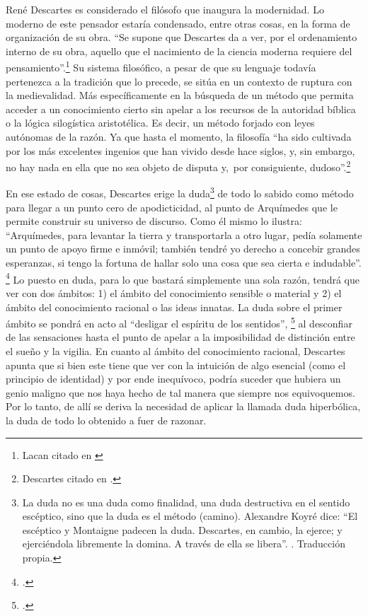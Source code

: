 René Descartes es considerado el filósofo que inaugura la modernidad. Lo moderno de este pensador estaría condensado, entre otras cosas, en la forma de organización de su obra. \enquote{Se supone que Descartes da a ver, por el ordenamiento interno de su obra, aquello que el nacimiento de la ciencia moderna requiere del pensamiento}.\footnote{Lacan citado en \cite[][41]{@7128-MILNER1999}} Su sistema filosófico, a pesar de que su lenguaje todavía pertenezca a la tradición que lo precede, se sitúa en un contexto de ruptura con la medievalidad. Más específicamente en la búsqueda de un método que permita acceder a un conocimiento cierto sin apelar a los recursos de la autoridad bíblica o la lógica silogística aristotélica. Es decir, un método forjado con leyes autónomas de la razón. Ya que hasta el momento, la filosofía \enquote{ha sido cultivada por los más excelentes ingenios que han vivido desde hace siglos, y, sin embargo, no hay nada en ella que no sea objeto de disputa y,~por consiguiente, dudoso}.\footnote{Descartes citado en \cite[][164]{@7114-CARPIO1980}.}

En ese estado de cosas, Descartes erige la duda\footnote{La duda no es una duda como finalidad, una duda destructiva en el sentido escéptico, sino que la duda es el método (camino). Alexandre Koyré dice: \enquote{El escéptico y Montaigne padecen la duda. Descartes, en cambio, la ejerce; y ejerciéndola libremente la domina. A través de ella se libera}. \cite[][196]{@7115-KOYRE1984}. Traducción propia.} de todo lo sabido como método para llegar a un punto cero de apodicticidad, al punto de Arquímedes que le permite construir su universo de discurso. Como él mismo lo ilustra: \enquote{Arquímedes, para levantar la tierra y transportarla a otro lugar, pedía solamente un punto de apoyo firme e inmóvil; también tendré yo derecho a concebir grandes esperanzas, si tengo la fortuna de hallar solo una cosa que sea cierta e indudable}. \footcite[][119]{@7116-DESCARTES1941} Lo puesto en duda, para lo que bastará simplemente una sola razón, tendrá que ver con dos ámbitos: 1) el ámbito del conocimiento sensible o material y 2) el ámbito del conocimiento racional o las ideas innatas. La duda sobre el primer ámbito se pondrá en acto al \enquote{desligar el espíritu de los sentidos}, \footcite[][107]{@7116-DESCARTES1941} al desconfiar de las sensaciones hasta el punto de apelar a la imposibilidad de distinción entre el sueño y la vigilia. En cuanto al ámbito del conocimiento racional, Descartes apunta que si bien este tiene que ver con la intuición de algo esencial (como el principio de identidad) y por ende inequívoco, podría suceder que hubiera un genio maligno  que nos haya hecho de tal manera que siempre nos equivoquemos. Por lo tanto, de allí se deriva la necesidad de aplicar la llamada duda hiperbólica, la duda de todo lo obtenido a fuer de razonar.

